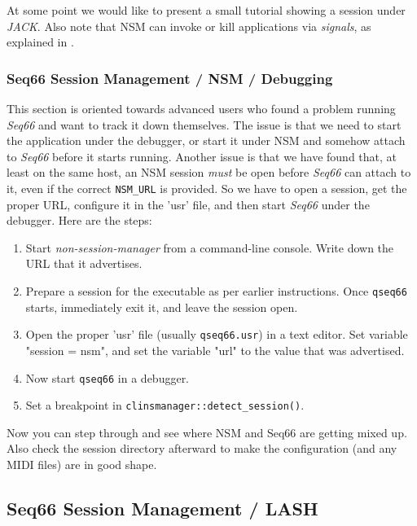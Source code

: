    At some point we would like to present a small tutorial showing a session
   under \textsl{JACK}.
   Also note that NSM can invoke or kill applications via
   \textsl{signals}, as explained in 
   .

\subsubsection{Seq66 Session Management / NSM / Debugging}
\label{subsubsec:sessions_debugging}

   This section is oriented towards advanced users who found a problem running
   \textsl{Seq66} and want to track it down themselves.  The issue is that we
   need to start the application under the debugger, or start it under NSM and
   somehow attach to \textsl{Seq66} before it starts running.  Another issue is
   that we have found that, at least on the same host, an NSM session
   \textsl{must} be open before \textsl{Seq66} can attach to it, even if the
   correct \texttt{NSM\_URL} is provided.
   So we have to open a session, get the proper URL, configure it in the 'usr'
   file, and then start \textsl{Seq66} under the debugger.
   Here are the steps:

   \begin{enumerate}
      \item Start \textsl{non-session-manager} from a command-line console.
         Write down the URL that it advertises.
      \item Prepare a session for the executable as per earlier instructions.
         Once \texttt{qseq66} starts, immediately exit it, and leave the session
         open.
      \item Open the proper 'usr' file (usually \texttt{qseq66.usr}) in a 
         text editor.  Set variable "session = nsm", and set the variable "url"
         to the value that was advertised.
      \item Now start \texttt{qseq66} in a debugger.
      \item Set a breakpoint in \texttt{clinsmanager::detect\_session()}.
   \end{enumerate}
   
   Now you can step through and see where NSM and Seq66 are getting mixed up.
   Also check the session directory afterward to make the configuration
   (and any MIDI files) are in good shape.

\subsection{Seq66 Session Management / LASH}
\label{subsec:sessions_lash}

